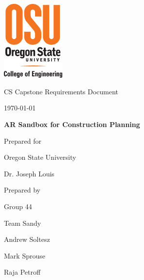 \documentclass[onecolumn, draftclsnofoot,10pt, compsoc]{IEEEtran}
\def \CapstoneTeamName{		Team Sandy}
\def \CapstoneTeamNumber{		44}
\def \GroupMemberOne{			Andrew Soltesz}
\def \GroupMemberTwo{			Mark Sprouse}
\def \GroupMemberThree{			Raja Petroff}
\def \CapstoneProjectName{		AR Sandbox for Construction Planning}
\def \CapstoneSponsorCompany{	Oregon State University}
\def \CapstoneSponsorPerson{		Dr. Joseph Louis}
\def \DocType{		%
				Requirements Document
				}
\newcommand{\NameSigPair}[1]{\par
\makebox[2.75in][r]{#1} \hfil 	\makebox[3.25in]{\makebox[2.25in]{\hrulefill} \hfill		\makebox[.75in]{\hrulefill}}
\par\vspace{-12pt} \textit{\tiny\noindent
\makebox[2.75in]{} \hfil		\makebox[3.25in]{\makebox[2.25in][r]{Signature} \hfill	\makebox[.75in][r]{Date}}}}
\renewcommand{\NameSigPair}[1]{#1}
\begin{document}
\begin{titlepage}
    \begin{singlespace}
    	\includegraphics[height=4cm]{coe_v_spot1}
        \hfill 
        \par\vspace{.2in}
        \centering
        \scshape{
            \huge CS Capstone \DocType \par
            {\large\today}\par
            \vspace{.5in}
            \textbf{\Huge\CapstoneProjectName}\par
            \vfill
            {\large Prepared for}\par
            \Huge \CapstoneSponsorCompany\par
            \vspace{5pt}
            {\Large\NameSigPair{\CapstoneSponsorPerson}\par}
            {\large Prepared by }\par
            Group\CapstoneTeamNumber\par
            \CapstoneTeamName\par 
            \vspace{5pt}
            {\Large
                \NameSigPair{\GroupMemberOne}\par
                \NameSigPair{\GroupMemberTwo}\par
                \NameSigPair{\GroupMemberThree}\par
            }
            \vspace{20pt}
        }
    \end{singlespace}
\end{titlepage}
\newpage
{}
\tableofcontents
\clearpage
\end{document}
